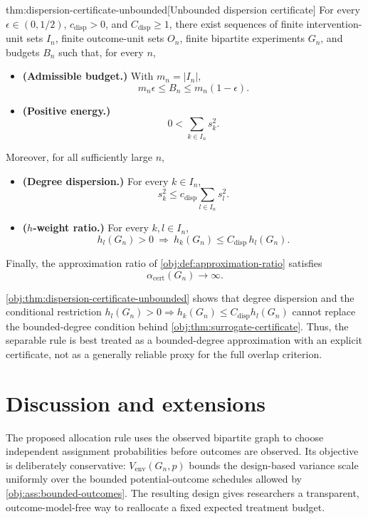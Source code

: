 \documentclass[11pt]{article}
\begin{document}
\begin{theoremv}{thm:dispersion-certificate-unbounded}[Unbounded dispersion certificate]
For every $\epsilon\in(0,1/2)$, $c_{\mathrm{disp}}>0$, and $C_{\mathrm{disp}}\geq 1$, there exist sequences of finite intervention-unit sets $I_n$, finite outcome-unit sets $O_n$, finite bipartite experiments $G_n$, and budgets $B_n$ such that, for every $n$,

\begin{itemize}

\item \textbf{(Admissible budget.)} With $m_n=|I_n|$,
\[
m_n\epsilon\leq B_n\leq m_n(1-\epsilon).
\]

\item \textbf{(Positive energy.)}
\[
0<\sum_{k\in I_n}s_k^2.
\]

\end{itemize}

Moreover, for all sufficiently large $n$,

\begin{itemize}

\item \textbf{(Degree dispersion.)} For every $k\in I_n$,
\[
s_k^2\leq c_{\mathrm{disp}}\sum_{l\in I_n}s_l^2.
\]

\item \textbf{($h$-weight ratio.)} For every $k,l\in I_n$,
\[
h_l(G_n)>0\ \Longrightarrow\ h_k(G_n)\leq C_{\mathrm{disp}}\,h_l(G_n).
\]

\end{itemize}

Finally, the approximation ratio of \cref{obj:def:approximation-ratio} satisfies
\[
\alpha_{\mathrm{cert}}(G_n)\longrightarrow\infty .
\]
\end{theoremv}

\cref{obj:thm:dispersion-certificate-unbounded} shows that degree dispersion and the conditional restriction \(h_l(G_n)>0\Longrightarrow h_k(G_n)\le C_{\mathrm{disp}}h_l(G_n)\) cannot replace the bounded-degree condition behind \cref{obj:thm:surrogate-certificate}. Thus, the separable rule is best treated as a bounded-degree approximation with an explicit certificate, not as a generally reliable proxy for the full overlap criterion.


\section{Discussion and extensions}

The proposed allocation rule uses the observed bipartite graph to choose independent assignment probabilities before outcomes are observed. Its objective is deliberately conservative: \(V_{\mathrm{env}}(G_n,p)\) bounds the design-based variance scale uniformly over the bounded potential-outcome schedules allowed by \cref{obj:ass:bounded-outcomes}. The resulting design gives researchers a transparent, outcome-model-free way to reallocate a fixed expected treatment budget.
\end{document}
